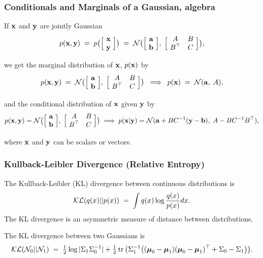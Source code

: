 \begin{frame}
\frametitle{Conditionals and Marginals of a Gaussian, algebra}

If ${\bf x}$ and ${\bf y}$ are jointly Gaussian
\[
p(\mathbf x,\mathbf y)\;=\;p\big(\Big[\!\begin{array}{c}\mathbf x\\ \mathbf y\end{array}
\!\Big]\big)\;=\;{\cal N}\big(\Big[\!\begin{array}{c}{\bf a} \\ {\bf b}\end{array}\!\Big],
\;\Big[\!\begin{array}{cc}A & B \\ B^\top & C\end{array}\!\Big]\big),
\]

we get the marginal distribution of ${\bf x}$, $p(\mathbf x)$ by
\[
p(\mathbf x,\mathbf y)\;=\;{\cal N}\big(\Big[\!\begin{array}{c}{\bf a} \\ {\bf b}
\end{array}\!\Big],
\;\Big[\!\begin{array}{cc}A & B \\ B^\top & C\end{array}\!\Big]\big)
\;\;\Longrightarrow\;\;p(\mathbf x)\;=\;{\cal N}({\bf a},\;A),
\]

and the conditional distribution of ${\bf x}$ given ${\bf y}$ by
\[
p(\mathbf x,\mathbf y)={\cal N}\big(\Big[\!\begin{array}{c}{\bf a} \\ {\bf b}
\end{array}\!\Big],
\;\Big[\!\begin{array}{cc}A & B \\ B^\top & C\end{array}\!\Big]\big)
\;\Longrightarrow\;p(\mathbf x|\mathbf y)={\cal N}({\bf a}+BC^{-1}(\mathbf y-\mathbf b),\;
A-BC^{-1}B^\top),
\]

where ${\bf x}$ and ${\bf y}$ can be scalars or vectors.
\end{frame}


\begin{frame}
\frametitle{Kullback-Leibler Divergence (Relative Entropy)}

The Kullback-Leibler (KL) divergence between continuous distributions is
%
\[
{\cal KL}(q(x)||p(x))\;=\;\int q(x)\log\frac{q(x)}{p(x)}dx.
\]
%
The KL divergence is an asymmetric measure of distance between distributions.

The KL divergence between two Gaussians is
\[
{\cal KL}({\cal N}_0||{\cal N}_1)\;=\;\tfrac{1}{2}\log|\Sigma_1\Sigma_0^{-1}|
+\tfrac{1}{2}\operatorname{tr}\big(\Sigma_1^{-1}
\big((\boldsymbol{\mu}_0-\boldsymbol{\mu}_1)
(\boldsymbol{\mu}_0-\boldsymbol{\mu}_1)^\top + \Sigma_0 - \Sigma_1\big)\big).
\]

\end{frame}

